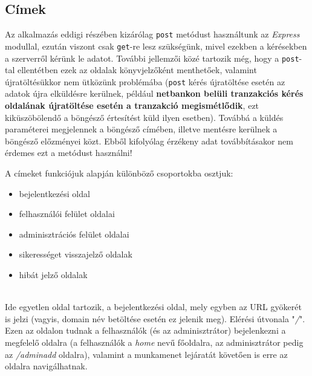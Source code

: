 
\subsection{Címek}

Az alkalmazás eddigi részében kizárólag \texttt{post} metódust használtunk az \textit{Express} modullal, ezután viszont csak \texttt{get}-re lesz szükségünk, mivel ezekben a kérésekben a szerverről kérünk le adatot. További jellemzői közé tartozik még, hogy a \texttt{post}-tal ellentétben ezek az oldalak könyvjelzőként menthetőek, valamint újratöltésükkor nem ütközünk problémába (\texttt{post} kérés újratöltése esetén az adatok újra elküldésre kerülnek, például \textbf{netbankon belüli tranzakciós kérés oldalának újratöltése esetén a tranzakció megismétlődik}, ezt kiküszöbölendő a böngésző értesítést küld ilyen esetben). Továbbá a küldés paraméterei megjelennek a böngésző címében, illetve mentésre kerülnek a böngésző előzményei közt. Ebből kifolyólag érzékeny adat továbbításakor nem érdemes ezt a metódust használni!

A címeket funkciójuk alapján különböző csoportokba osztjuk:

\begin{itemize}
\item{bejelentkezési oldal}
\item{felhasználói felület oldalai}
\item{adminisztrációs felület oldalai}
\item{sikerességet visszajelző oldalak}
\item{hibát jelző oldalak}
\end{itemize}

\\

Ide egyetlen oldal tartozik, a bejelentkezési oldal, mely egyben az URL gyökerét is jelzi (vagyis, domain név betöltése esetén ez jelenik meg). Elérési útvonala "\textit{/}". Ezen az oldalon tudnak a felhasználók (és az adminisztrátor) bejelenkezni a megfelelő oldalra (a felhasználók a \textit{home} nevű főoldalra, az adminisztrátor pedig az \textit{/adminadd} oldalra), valamint a munkamenet lejáratát követően is erre az oldalra navigálhatnak.\\

\\

